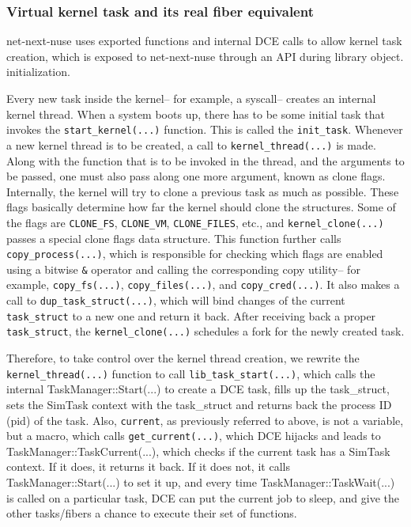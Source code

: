 \documentclass{sig-alternate}
\begin{document}
\subsubsection{Virtual kernel task and its real fiber equivalent}
net-next-nuse uses exported functions and internal DCE calls to allow kernel task creation,  which is exposed to net-next-nuse through an API during library object.
initialization.

\sloppy Every new task inside the kernel-- for example, a syscall--
creates an internal kernel thread.  When a system boots up, there has to be some initial task that invokes the \texttt{start\_kernel(...)} 
function. This is called the \texttt{init\_task}. Whenever a new kernel thread is to be created, a call to \texttt{kernel\_thread(...)} is made. Along with the 
function that is to be invoked in the thread, and the arguments to be passed, one must also pass along one more argument, known as clone flags. 
Internally, the kernel will try to clone a previous task as much as possible. These flags basically determine 
how far the kernel should clone the structures. Some of the flags are \texttt{CLONE\_FS}, \texttt{CLONE\_VM}, \texttt{CLONE\_FILES}, etc., 
and \texttt{kernel\_clone(...)} passes a special clone flags data structure. This function further calls \texttt{copy\_process(...)}, which is responsible for checking 
which flags are enabled using a bitwise \texttt{\&} operator and calling the corresponding copy utility-- for example, \texttt{copy\_fs(...)}, \texttt{copy\_files(...)}, 
and \texttt{copy\_cred(...)}.  It also makes a call to \texttt{dup\_task\_struct(...)}, which will bind changes of the current \texttt{task\_struct} to a new one and 
return it back. After receiving back a proper \texttt{task\_struct}, the \texttt{kernel\_clone(...)} schedules a fork for the newly created task.

\sloppy Therefore, to take  control over the kernel thread creation, we rewrite the \texttt{kernel\_thread(...)} function to call 
\texttt{lib\_task\_start(...)}, which calls the 
internal TaskManager::Start(...) to create a DCE task, fills up the task\_struct, sets the SimTask context with the task\_struct and returns back 
the process ID (pid) of the task. Also, \texttt{current}, as previously referred to above, is not a variable, but a macro, which calls \texttt{get\_current(...)}, which DCE hijacks and leads to TaskManager::TaskCurrent(...), which checks if the current task has a SimTask context. If it does, it returns it back. 
If it does not, it calls TaskManager::Start(...) to set it up, and every time 
TaskManager::TaskWait(...)  is called on a particular task, DCE can put the current job to sleep, and give the other tasks/fibers a chance to 
execute their set of functions. 
 
\end{document}
